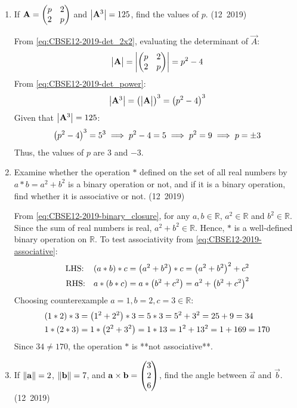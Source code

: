 \begin{enumerate}[label=\thesubsection.\arabic*, ref=\thesubsection.\theenumi]
\item If $\mathbf{A} = \begin{pmatrix}p & 2 \\ 2 & p\end{pmatrix}$ and $\begin{vmatrix}\mathbf{A}^3\end{vmatrix} = 125$, find the values of $p$.
\hfill (12~2019)

\solution
From \eqref{eq:CBSE12-2019-det_2x2}, evaluating the determinant of $\vec{A}$:
\begin{align}
	\begin{vmatrix}\mathbf{A}\end{vmatrix} = \begin{vmatrix}\begin{pmatrix}p & 2 \\ 2 & p\end{pmatrix}\end{vmatrix} = p^2 - 4
\end{align}
From \eqref{eq:CBSE12-2019-det_power}:
\begin{align}
	\begin{vmatrix}\mathbf{A}^3\end{vmatrix} = \left(\begin{vmatrix}\mathbf{A}\end{vmatrix}\right)^3 = \left(p^2 - 4\right)^3
\end{align}
Given that $\begin{vmatrix}\mathbf{A}^3\end{vmatrix} = 125$:
\begin{align}
	\left(p^2 - 4\right)^3 = 5^3 \implies p^2 - 4 = 5 \implies p^2 = 9 \implies p = \pm 3
\end{align}
Thus, the values of $p$ are $3$ and $-3$.


\item Examine whether the operation $*$ defined on the set of all real numbers by $a*b = a^2 + b^2$ is a binary operation or not, and if it is a binary operation, find whether it is associative or not.
\hfill (12~2019)

\solution
From \eqref{eq:CBSE12-2019-binary_closure}, for any $a, b \in \mathbb{R}$, $a^2 \in \mathbb{R}$ and $b^2 \in \mathbb{R}$. Since the sum of real numbers is real, $a^2 + b^2 \in \mathbb{R}$. Hence, $*$ is a well-defined binary operation on $\mathbb{R}$.
To test associativity from \eqref{eq:CBSE12-2019-associative}:
\begin{align}
	\text{LHS:} \quad \left(a * b\right) * c &= \left(a^2 + b^2\right) * c = \left(a^2 + b^2\right)^2 + c^2 \\
	\text{RHS:} \quad a * \left(b * c\right) &= a * \left(b^2 + c^2\right) = a^2 + \left(b^2 + c^2\right)^2
\end{align}
Choosing counterexample $a = 1, b = 2, c = 3 \in \mathbb{R}$:
\begin{align}
	\left(1 * 2\right) * 3 &= \left(1^2 + 2^2\right) * 3 = 5 * 3 = 5^2 + 3^2 = 25 + 9 = 34 \\
	1 * \left(2 * 3\right) &= 1 * \left(2^2 + 3^2\right) = 1 * 13 = 1^2 + 13^2 = 1 + 169 = 170
\end{align}
Since $34 \neq 170$, the operation $*$ is **not associative**.

\item If $\left\lVert\mathbf{a}\right\rVert = 2$, $\left\lVert\mathbf{b}\right\rVert = 7$, and $\mathbf{a} \times \mathbf{b} = \begin{pmatrix}3 \\ 2 \\ 6\end{pmatrix}$, find the angle between $\vec{a}$ and $\vec{b}$.
\hfill (12~2019)


\end{enumerate}
